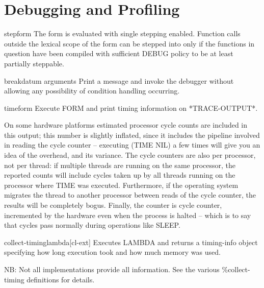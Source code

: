 \documentclass[10pt,english]{book}
\begin{document}
\section{Debugging and Profiling}
\label{sec:debugging}

\begin{macro}{step}{form}
  The form is evaluated with single stepping enabled. Function calls
outside the lexical scope of the form can be stepped into only if the
functions in question have been compiled with sufficient DEBUG policy
to be at least partially steppable.
\end{macro}

\begin{function}{break}{\op datum \rest arguments}
  Print a message and invoke the debugger without allowing any possibility
  of condition handling occurring.
\end{function}

\begin{macro}{time}{form}
  Execute FORM and print timing information on *TRACE-OUTPUT*.

On some hardware platforms estimated processor cycle counts are
included in this output; this number is slightly inflated, since it
includes the pipeline involved in reading the cycle counter --
executing (TIME NIL) a few times will give you an idea of the
overhead, and its variance. The cycle counters are also per processor,
not per thread: if multiple threads are running on the same processor,
the reported counts will include cycles taken up by all threads
running on the processor where TIME was executed. Furthermore, if the
operating system migrates the thread to another processor between
reads of the cycle counter, the results will be completely bogus.
Finally, the counter is cycle counter, incremented by the hardware
even when the process is halted -- which is to say that cycles pass
normally during operations like SLEEP.
\end{macro}

\begin{function}{collect-timing}{lambda}[cl-ext]
  Executes LAMBDA and returns a timing-info object specifying
  how long execution took and how much memory was used.

NB: Not all implementations provide all information. See the
various \%collect-timing definitions for details.
\end{function}
\end{document}

